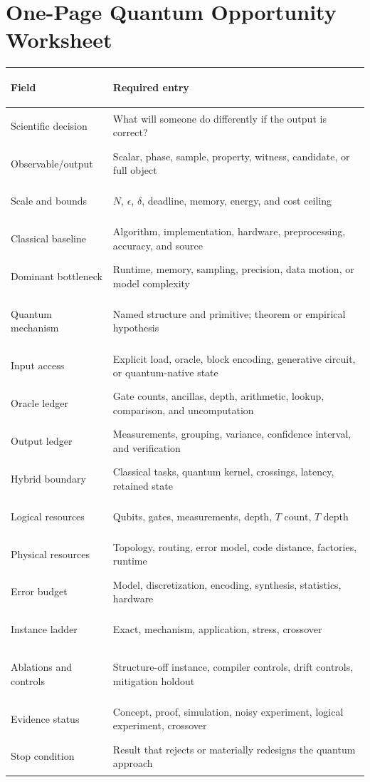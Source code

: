 \section{One-Page Quantum Opportunity Worksheet}\label{app:worksheet}

\begin{longtable}{>{\bfseries\raggedright\arraybackslash}p{} >{\raggedright\arraybackslash}p{}}
\toprule
Field & Required entry\\
\midrule
Scientific decision & What will someone do differently if the output is correct?\\
Observable/output & Scalar, phase, sample, property, witness, candidate, or full object\\
Scale and bounds & $N$, $\epsilon$, $\delta$, deadline, memory, energy, and cost ceiling\\
Classical baseline & Algorithm, implementation, hardware, preprocessing, accuracy, and source\\
Dominant bottleneck & Runtime, memory, sampling, precision, data motion, or model complexity\\
Quantum mechanism & Named structure and primitive; theorem or empirical hypothesis\\
Input access & Explicit load, oracle, block encoding, generative circuit, or quantum-native state\\
Oracle ledger & Gate counts, ancillas, depth, arithmetic, lookup, comparison, and uncomputation\\
Output ledger & Measurements, grouping, variance, confidence interval, and verification\\
Hybrid boundary & Classical tasks, quantum kernel, crossings, latency, retained state\\
Logical resources & Qubits, gates, measurements, depth, $T$ count, $T$ depth\\
Physical resources & Topology, routing, error model, code distance, factories, runtime\\
Error budget & Model, discretization, encoding, synthesis, statistics, hardware\\
Instance ladder & Exact, mechanism, application, stress, crossover\\
Ablations and controls & Structure-off instance, compiler controls, drift controls, mitigation holdout\\
Evidence status & Concept, proof, simulation, noisy experiment, logical experiment, crossover\\
Stop condition & Result that rejects or materially redesigns the quantum approach\\
\bottomrule
\end{longtable}
